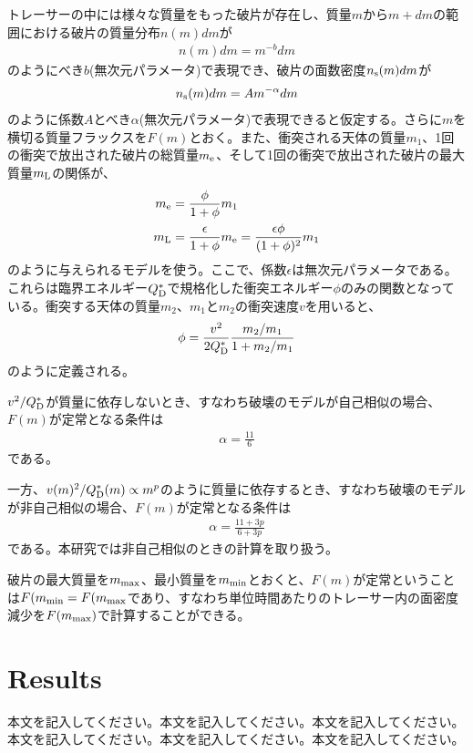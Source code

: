 \documentclass[a4paper,10pt,oneside,twocolumn,notitlepage,final]{jarticle}
\begin{document}
トレーサーの中には様々な質量をもった破片が存在し、質量$m$から$m+dm$の範囲における破片の質量分布$n(m)dm$が
\begin{align}
 n(m)dm = m^{-b}dm
\end{align}
のようにべき$b$(無次元パラメータ)で表現でき、破片の面数密度$n_{\rm s} (m) dm$が
\begin{align}
 n_{\rm s} (m) dm = A m^{- \alpha} dm
\end{align}
のように係数$A$とべき$\alpha$(無次元パラメータ)で表現できると仮定する。さらに$m$を横切る質量フラックスを$F(m)$とおく。また、衝突される天体の質量$m_1$、1回の衝突で放出された破片の総質量$m_{\rm e}$、そして1回の衝突で放出された破片の最大質量$m_{\rm L}$の関係が、
\begin{align}
 m_{\rm e} &= \frac{\phi}{1 + \phi}m_1\\
 m_{\rm L} &= \frac{\epsilon}{1 + \phi}m_{\rm e} = \frac{\epsilon \phi}{(1 + \phi)^2}m_1
\end{align}
のように与えられるモデルを使う。ここで、係数$\epsilon$は無次元パラメータである。これらは臨界エネルギー$Q_{\rm D}^{\ast}$で規格化した衝突エネルギー$\phi$のみの関数となっている。衝突する天体の質量$m_2$、$m_1$と$m_2$の衝突速度$v$を用いると、
\begin{align}
 \phi = \frac{v^2}{2 Q_{\rm D}^{\ast}} \frac{m_2/m_1}{1 + m_2/m_1}
\end{align}
のように定義される。

$v^2/Q_{\rm D}^{\ast}$が質量に依存しないとき、すなわち破壊のモデルが自己相似の場合、$F(m)$が定常となる条件は
\begin{align}
 \alpha = \frac{11}{6}
\end{align}
である\citep{Tanaka1996}。

一方、$v(m)^2/Q_{\rm D}^{\ast}(m) \propto m^p$のように質量に依存するとき、すなわち破壊のモデルが非自己相似の場合、$F(m)$が定常となる条件は
\begin{align}
 \alpha = \frac{11 + 3p}{6 + 3p}
\end{align}
である\citep{Kobayashi2010}。本研究では非自己相似のときの計算を取り扱う。

破片の最大質量を$m_{\rm max}$、最小質量を$m_{\rm min}$とおくと、$F(m)$が定常ということは$F(m_{\rm min} = F(m_{\rm max}$であり、すなわち単位時間あたりのトレーサー内の面密度減少を$F(m_{\rm max})$で計算することができる。


\section{Results}
本文を記入してください。本文を記入してください。本文を記入してください。本文を記入してください。本文を記入してください。本文を記入してください。
\end{document}
